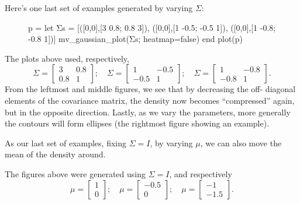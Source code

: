 Here's one last set of examples generated by varying $\Sigma$:
\begin{figure}
    \begin{jlcode}
    p = let
        Σs = [([0,0],[3 0.8; 0.8 3]),
              ([0,0],[1 -0.5; -0.5 1]),
              ([0,0],[1 -0.8; -0.8 1])]
        mv_gaussian_plot(Σs; heatmap=false)
    end
    plot(p)
    \end{jlcode}
    \begin{center}
    \end{center}
\end{figure}

The plots above used, respectively, %
\begin{equation}
    \Sigma = \begin{bmatrix}
    3 & 0.8\\
    0.8 & 1
    \end{bmatrix};\quad
    \Sigma = \begin{bmatrix}
    1 & -0.5\\
    -0.5 & 1
    \end{bmatrix};\quad
    \Sigma = \begin{bmatrix}
    1 & -0.8\\
    -0.8 & 1
    \end{bmatrix}.
\end{equation}
From the leftmost and middle figures, we see that by decreasing the off-
diagonal elements of the covariance matrix, the density now becomes ``compressed''
again, but in the opposite direction. Lastly, as we vary the parameters,
more generally the contours will form ellipses (the rightmost figure
showing an example).

As our last set of examples, fixing $\Sigma = I$, by varying $\mu$, we can also move
the mean of the density around.

The figures above were generated using $\Sigma = I$, and respectively
\begin{equation}
    \mu = \begin{bmatrix}
    1\\
    0
    \end{bmatrix};\quad
    \mu = \begin{bmatrix}
    -0.5\\
    0
    \end{bmatrix};\quad
    \mu = \begin{bmatrix}
    -1\\
    -1.5
    \end{bmatrix}.    
\end{equation}



